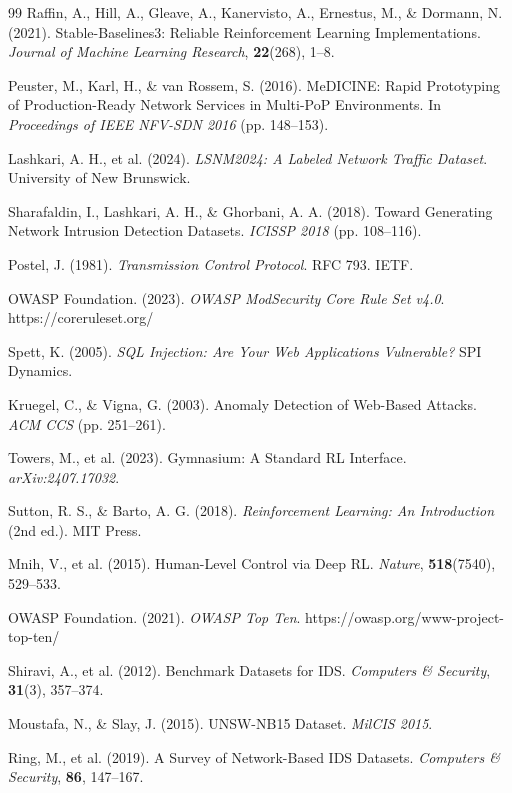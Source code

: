 \documentclass[12pt,a4paper,twoside]{report}
\begin{document}
{{{{{{{{{{{{{{\begin{thebibliography}{99}
 Raffin, A., Hill, A., Gleave, A., Kanervisto, A., Ernestus, M., \& Dormann, N. (2021). Stable-Baselines3: Reliable Reinforcement Learning Implementations. \textit{Journal of Machine Learning Research}, \textbf{22}(268), 1--8.

 Peuster, M., Karl, H., \& van Rossem, S. (2016). MeDICINE: Rapid Prototyping of Production-Ready Network Services in Multi-PoP Environments. In \textit{Proceedings of IEEE NFV-SDN 2016} (pp. 148--153).

 Lashkari, A. H., et al. (2024). \textit{LSNM2024: A Labeled Network Traffic Dataset}. University of New Brunswick.

 Sharafaldin, I., Lashkari, A. H., \& Ghorbani, A. A. (2018). Toward Generating Network Intrusion Detection Datasets. \textit{ICISSP 2018} (pp. 108--116).

 Postel, J. (1981). \textit{Transmission Control Protocol}. RFC 793. IETF.

 OWASP Foundation. (2023). \textit{OWASP ModSecurity Core Rule Set v4.0}. https://coreruleset.org/

 Spett, K. (2005). \textit{SQL Injection: Are Your Web Applications Vulnerable?} SPI Dynamics.

 Kruegel, C., \& Vigna, G. (2003). Anomaly Detection of Web-Based Attacks. \textit{ACM CCS} (pp. 251--261).

 Towers, M., et al. (2023). Gymnasium: A Standard RL Interface. \textit{arXiv:2407.17032}.

 Sutton, R. S., \& Barto, A. G. (2018). \textit{Reinforcement Learning: An Introduction} (2nd ed.). MIT Press.

 Mnih, V., et al. (2015). Human-Level Control via Deep RL. \textit{Nature}, \textbf{518}(7540), 529--533.

 OWASP Foundation. (2021). \textit{OWASP Top Ten}. https://owasp.org/www-project-top-ten/

 Shiravi, A., et al. (2012). Benchmark Datasets for IDS. \textit{Computers \& Security}, \textbf{31}(3), 357--374.

 Moustafa, N., \& Slay, J. (2015). UNSW-NB15 Dataset. \textit{MilCIS 2015}.

 Ring, M., et al. (2019). A Survey of Network-Based IDS Datasets. \textit{Computers \& Security}, \textbf{86}, 147--167.


\end{thebibliography}}}}}}}}}}}}}}}
\end{document}
